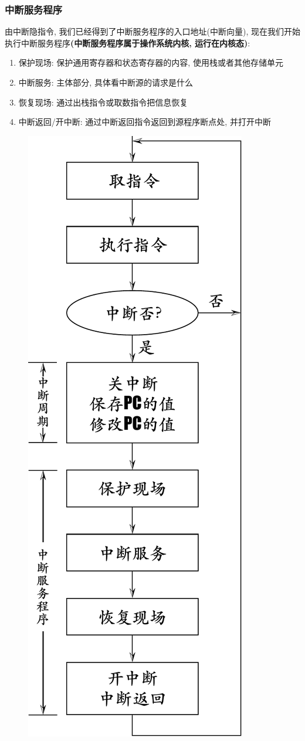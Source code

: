 \subsubsection{中断服务程序}
由中断隐指令, 我们已经得到了中断服务程序的入口地址(中断向量), 现在我们开始执行中断服务程序\textbf{(中断服务程序属于操作系统内核, 运行在内核态)}:
\begin{enumerate}
\item 保护现场: 保护通用寄存器和状态寄存器的内容, 使用栈或者其他存储单元
\item 中断服务: 主体部分, 具体看中断源的请求是什么
\item 恢复现场: 通过出栈指令或取数指令把信息恢复
\item 中断返回/开中断: 通过中断返回指令返回到源程序断点处, 并打开中断
\end{enumerate}
\begin{figure}[H]
\centering
\includegraphics[scale=.4]{img/figure57}
\end{figure}

